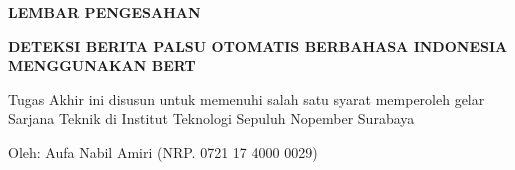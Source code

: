\begin{center}
  \large
  \textbf{LEMBAR PENGESAHAN}
\end{center}

\thispagestyle{empty}

\begin{center}
  \textbf{DETEKSI BERITA PALSU OTOMATIS BERBAHASA INDONESIA MENGGUNAKAN BERT}
\end{center}

\begingroup
\small

\begin{center}
  Tugas Akhir ini disusun untuk memenuhi salah satu syarat memperoleh gelar Sarjana Teknik di Institut Teknologi Sepuluh Nopember Surabaya

\end{center}

\begin{center}
  Oleh: Aufa Nabil Amiri (NRP. 0721 17 4000 0029)
\end{center}

\begingroup
\setlength{\tabcolsep}{0pt}

